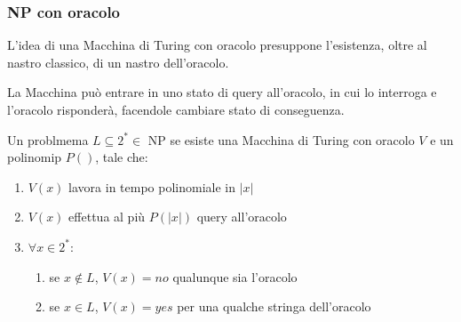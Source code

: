 \subsubsection{NP con oracolo}
L'idea di una Macchina di Turing con oracolo presuppone l'esistenza, oltre 
al nastro classico, di un nastro dell'oracolo.

La Macchina può entrare in uno stato di query all'oracolo, 
in cui lo interroga e l'oracolo risponderà, facendole cambiare stato di conseguenza.

\begin{theorem}
    Un problmema $L \subseteq 2^* \in $ NP se esiste una Macchina di Turing con oracolo $V$ e
    un polinomip $P()$, tale che:
    \begin{enumerate}
        \item $V(x)$ lavora in tempo polinomiale in $|x|$
        \item $V(x)$ effettua al più $P(|x|)$ query all'oracolo
        \item $\forall x \in 2^*$:
        \begin{enumerate}
            \item se $x \notin L$, $V(x) = no$ qualunque sia l'oracolo
            \item se $x \in L$, $V(x) = yes$ per una qualche stringa dell'oracolo
        \end{enumerate}
    \end{enumerate}
\end{theorem}





